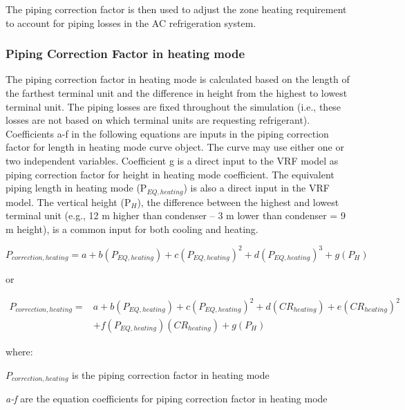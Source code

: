 The piping correction factor is then used to adjust the zone heating requirement to account for piping losses in the AC refrigeration system.

\subsubsection{Piping Correction Factor in heating mode}\label{piping-correction-factor-in-heating-mode}

The piping correction factor in heating mode is calculated based on the length of the farthest terminal unit and the difference in height from the highest to lowest terminal unit. The piping losses are fixed throughout the simulation (i.e., these losses are not based on which terminal units are requesting refrigerant). Coefficients a-f in the following equations are inputs in the piping correction factor for length in heating mode curve object. The curve may use either one or two independent variables. Coefficient g is a direct input to the VRF model as piping correction factor for height in heating mode coefficient. The equivalent piping length in heating mode (P\(_{EQ,heating}\)) is also a direct input in the VRF model. The vertical height (P\(_H\)), the difference between the highest and lowest terminal unit (e.g., 12 m higher than condenser – 3 m lower than condenser = 9 m height), is a common input for both cooling and heating.

\begin{equation}
  P_{correction,heating} = a + b \left( P_{EQ,heating} \right) + c \left( P_{EQ,heating} \right)^2 + d \left( P_{EQ,heating} \right)^3 + g \left( P_H \right)
\end{equation}

or

\begin{equation}
\begin{array}{rl}
{P_{correction,heating}} =& a + b \left( P_{EQ,heating} \right) + c \left( P_{EQ,heating} \right)^2 + d \left( CR_{heating} \right) + e \left( CR_{heating} \right)^2 \\
 & + f \left( P_{EQ,heating} \right) \left( CR_{heating} \right) + g \left( P_H \right)
\end{array}
\end{equation}

where:

\(P_{correction,heating}\) is the piping correction factor in heating mode

\emph{a-f} are the equation coefficients for piping correction factor in heating mode

